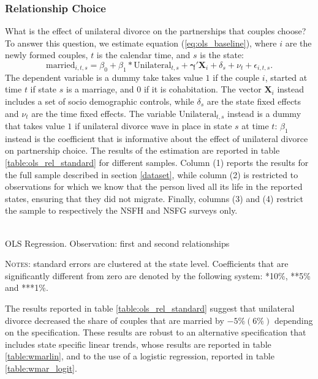 \documentclass[12pt]{article}
\numberwithin{table}{section}
\begin{document}
\subsubsection*{Relationship Choice}
What is the effect of unilateral divorce on the partnerships that couples choose? To answer this question, we estimate equation (\ref{eq:ols_baseline}), where $i$ are the newly formed couples, $t$ is the calendar time, and $s$ is the state: 
\begin{equation}\label{eq:ols_baseline}
\text{married}_{i,t,s}=\beta_0+\beta_1*\text{Unilateral}_{t,s}+\mathbf{\gamma'}\mathbf{X}_i+\delta_s+\nu_t+\epsilon_{i,t,s}.
\end{equation}
The dependent variable is a dummy take takes value $1$ if the couple $i$, started at time $t$ if state $s$ is a marriage, and 0 if it is cohabitation. The vector $\mathbf{X}_i$ instead includes a set of socio demographic controls, while $\delta_s$ are the state fixed effects and  $\nu_t$ are the time fixed effects. The variable $\text{Unilateral}_{t,s}$ instead is a dummy that takes value $1$ if unilateral divorce wave in place in state $s$ at time $t$: $\beta_1$ instead is the coefficient that is informative about the effect of unilateral divorce on partnership choice. The results of the estimation are reported in table \ref{table:ols_rel_standard} for different samples. Column (1) reports the results for the full sample described in section \ref{dataset}, while column (2) is restricted to observations for which we know that the person lived all its life in the reported states, ensuring that they did not migrate. Finally, columns (3) and (4) restrict the sample to respectively the NSFH and NSFG surveys only.

	\begin{table}[H]\centering
		\caption{\\OLS Regression. Observation: first and second relationships}
		\label{table:ols_rel_standard}
		\begin{threeparttable}[t]\centering
			
	\begin{tablenotes}[flushleft]
		\footnotesize{\item \textsc{Notes}: standard errors are clustered at the state level.
			Coefficients that are significantly different from zero are denoted by the following system: *10\%, **5\%  and ***1\%.}
	\end{tablenotes}
\end{threeparttable}
\end{table}
\FloatBarrier
The results reported in table \ref{table:ols_rel_standard} suggest that unilateral divorce decreased the share of couples that are married by $-5\%(6\%)$ depending on the specification. These results are robust to an alternative specification that includes state specific linear trends, whose results are reported in table \ref{table:wmarlin}, and to the use of a logistic regression, reported in table \ref{table:wmar_logit}.
\end{document}
